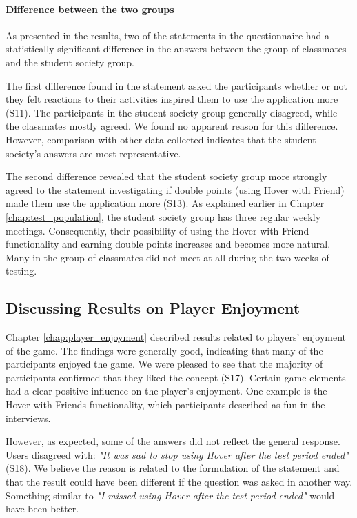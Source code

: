 \paragraph*{Difference between the two groups} 
As presented in the results, two of the statements in the questionnaire had a statistically significant difference in the answers between the group of classmates and the student society group.

The first difference found in the statement asked the participants whether or not they felt reactions to their activities inspired them to use the application more (S11). The participants in the student society group generally disagreed, while the classmates mostly agreed. We found no apparent reason for this difference. However, comparison with other data collected indicates that the student society’s answers are most representative.

The second difference revealed that the student society group more strongly agreed to the statement investigating if double points (using Hover with Friend) made them use the application more (S13). As explained earlier in Chapter \ref{chap:test_population}, the student society group has three regular weekly meetings. Consequently, their possibility of using the Hover with Friend functionality and earning double points increases and becomes more natural. Many in the group of classmates did not meet at all during the two weeks of testing.


\subsection{Discussing Results on Player Enjoyment}
Chapter \ref{chap:player_enjoyment} described results related to players’ enjoyment of the game. The findings were generally good, indicating that many of the participants enjoyed the game. We were pleased to see that the majority of participants confirmed that they liked the concept (S17). Certain game elements had a clear positive influence on the player’s enjoyment. One example is the Hover with Friends functionality, which participants described as fun in the interviews.

However, as expected, some of the answers did not reflect the general response. Users disagreed with: \textit{"It was sad to stop using Hover after the test period ended"} (S18). We believe the reason is related to the formulation of the statement and that the result could have been different if the question was asked in another way. Something similar to \textit{"I missed using Hover after the test period ended"} would have been better.

